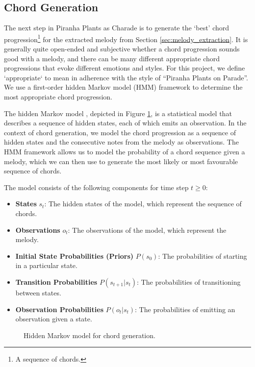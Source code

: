 \subsection{Chord Generation}
\label{sec:chord_generation}

The next step in Piranha Plants as Charade is to generate the `best' chord progression\footnote{A sequence of chords.} for the extracted melody from Section \ref{sec:melody_extraction}. It is generally quite open-ended and subjective whether a chord progression sounds good with a melody, and there can be many different appropriate chord progressions that evoke different emotions and styles. For this project, we define `appropriate` to mean in adherence with the style of ``Piranha Plants on Parade''. We use a first-order hidden Markov model (HMM) framework to determine the most appropriate chord progression.

The hidden Markov model \autocite{HMM:2023,SpeechLang:2025}, depicted in Figure \ref{fig:hmm}, is a statistical model that describes a sequence of hidden states, each of which emits an observation. In the context of chord generation, we model the chord progression as a sequence of hidden states and the consecutive notes from the melody as observations. The HMM framework allows us to model the probability of a chord sequence given a melody, which we can then use to generate the most likely or most favourable sequence of chords.

The model consists of the following components for time step $t \geq 0$:
\begin{itemize}
    \item \textbf{States} $s_t$: The hidden states of the model, which represent the sequence of chords.
    \item \textbf{Observations} $o_t$: The observations of the model, which represent the melody.
    \item \textbf{Initial State Probabilities (Priors)} $P(s_0)$: The probabilities of starting in a particular state.
    \item \textbf{Transition Probabilities} $P(s_{t+1} | s_t)$: The probabilities of transitioning between states.
    \item \textbf{Observation Probabilities} $P(o_t | s_t)$: The probabilities of emitting an observation given a state.
\end{itemize}

\begin{figure}
    \resizebox{\linewidth}{!}{}
    \caption{Hidden Markov model for chord generation.}
    \label{fig:hmm}
\end{figure}

